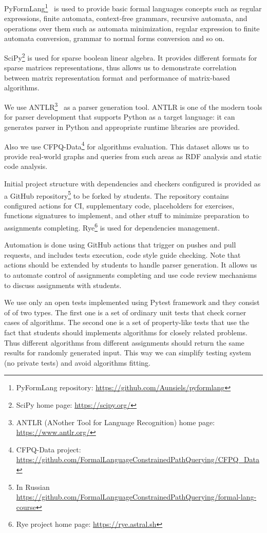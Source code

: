 \documentclass[sigconf]{acmart}
\begin{document}
PyFormLang\footnote{PyFormLang repository: \url{https://github.com/Aunsiels/pyformlang}}~\cite{10.1145/3408877.3432464} is used to provide basic formal languages concepts such as regular expressions, finite automata, context-free grammars, recursive automata, and operations over them such as automata minimization, regular expression to finite automata conversion, grammar to normal forms conversion and so on. 

SciPy\footnote{SciPy home page: \url{https://scipy.org/}} is used for sparse boolean linear algebra.
It provides different formats for sparse matrices representations, thus allows us to demonstrate correlation between matrix representation format and performance of matrix-based algorithms. 

We use ANTLR\footnote{ANTLR (ANother Tool for Language Recognition) home page: \url{https://www.antlr.org/}}~\cite{10.5555/2501720} as a parser generation tool.
ANTLR is one of the modern tools for parser development that supports Python as a target language: it can generates parser in Python and appropriate runtime libraries are provided.

Also we use CFPQ-Data\footnote{CFPQ-Data project: \url{https://github.com/FormalLanguageConstrainedPathQuerying/CFPQ_Data}} for algorithms evaluation.
This dataset allows us to provide real-world graphs and queries from such areas as RDF analysis and static code analysis. 

Initial project structure with dependencies and checkers configured is provided as a GitHub repository\footnote{In Russian \url{https://github.com/FormalLanguageConstrainedPathQuerying/formal-lang-course}} to be forked by students.
The repository contains configured actions for CI, supplementary code, placeholders for exercises, functions signatures to implement, and other stuff to minimize preparation to assignments completing.
Rye\footnote{Rye project home page: \url{https://rye.astral.sh}} is used for dependencies management.

Automation is done using GitHub actions that trigger on pushes and pull requests, and includes tests execution, code style guide checking.
Note that actions should be extended by students to handle parser generation.
It allows us to automate control of assignments completing and use code review mechanisms to discuss assignments with students.

We use only an open tests implemented using Pytest framework and they consist of of two types.
The first one is a set of ordinary unit tests that check corner cases of algorithms.
The second one is a set of property-like tests that use the fact that students should implements algorithms for closely related problems.
Thus different algorithms from different assignments should return the same results for randomly generated input. 
This way we can simplify testing system (no private tests) and avoid algorithms fitting. 
\end{document}
